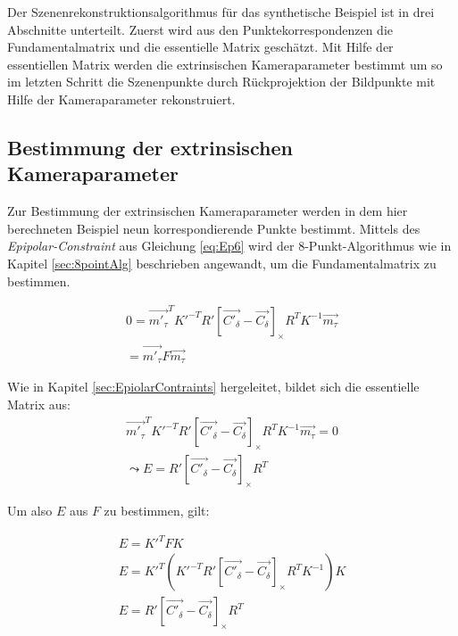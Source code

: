 Der Szenenrekonstruktionsalgorithmus für das synthetische Beispiel ist in drei Abschnitte unterteilt. Zuerst wird aus den Punktekorrespondenzen die Fundamentalmatrix und die essentielle Matrix geschätzt. Mit Hilfe der essentiellen Matrix werden die extrinsischen Kameraparameter bestimmt um so im letzten Schritt die Szenenpunkte durch Rückprojektion der Bildpunkte mit Hilfe der Kameraparameter rekonstruiert. 

\subsection{Bestimmung der extrinsischen Kameraparameter}

Zur Bestimmung der extrinsischen Kameraparameter werden in dem hier berechneten Beispiel neun korrespondierende Punkte bestimmt. Mittels des \textit{Epipolar-Constraint} aus Gleichung \ref{eq:Ep6} wird der 8-Punkt-Algorithmus wie in Kapitel \ref{sec:8pointAlg} beschrieben angewandt, um die Fundamentalmatrix zu bestimmen.

\begin{gather}
	0=\vec{m'_\tau}^TK'^{-T}R' \left[ \vec{C'_\delta}-\vec{C_\delta}\right]_\times R^TK^{-1}\vec{m_\tau}\\
	=\vec{m'_\tau}F\vec{m_\tau}
\end{gather}


Wie in Kapitel \ref{sec:EpiolarContraints} hergeleitet, bildet sich die essentielle Matrix aus:
\begin{gather}
	\vec{m'_\tau}^TK'^{-T}R' \left[ \vec{C'_\delta}-\vec{C_\delta}\right]_\times R^TK^{-1}\vec{m_\tau}=0\\
	\leadsto E = R' \left[ \vec{C'_\delta}-\vec{C_\delta}\right]_\times R^T		
\end{gather}

Um also $E$ aus $F$ zu bestimmen, gilt:


\begin{gather}
	 E= K'^T F K\\
    E= K'^T (K'^{-T}R' \left[ \vec{C'_\delta}-\vec{C_\delta}\right]_\times R^TK^{-1}) K\\
	E = R' \left[ \vec{C'_\delta}-\vec{C_\delta}\right]_\times R^T	
\end{gather}

